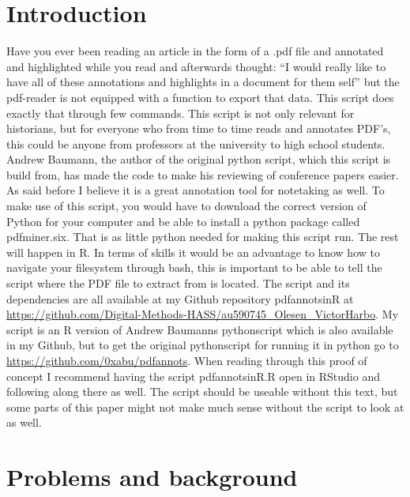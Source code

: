 \documentclass{article}
\begin{document}
\section{Introduction}
Have you ever been reading an article in the form of a .pdf file and annotated and highlighted while you read and afterwards thought: “I would really like to have all of these annotations and highlights in a document for them self” but the pdf-reader is not equipped with a function to export that data. This script does exactly that through few commands. This script is not only relevant for historians, but for everyone who from time to time reads and annotates PDF’s, this could be anyone from professors at the university to high school students. Andrew Baumann, the author of the original python script, which this script is build from, has made the code to make his reviewing of conference papers easier. As said before I believe it is a great annotation tool for notetaking as well. \newline
To make use of this script, you would have to download the correct version of Python for your computer and be able to install a python package called pdfminer.six. That is as little python needed for making this script run. The rest will happen in R. In terms of skills it would be an advantage to know how to navigate your filesystem through bash, this is important to be able to tell the script where the PDF file to extract from is located.\newline
The script and its dependencies are all available at my Github repository pdfannots\textunderscore in\textunderscore R at \url{https://github.com/Digital-Methods-HASS/au590745_Olesen_VictorHarbo}. My script is an R version of Andrew Baumanns pythonscript which is also available in my Github, but to get the original pythonscript for running it in python go to \url{https://github.com/0xabu/pdfannots}. When reading through this proof of concept I recommend having the script pdfannots\textunderscore inR.R open in RStudio and following along there as well. The script should be useable without this text, but some parts of this paper might not make much sense without the script to look at as well. 

\section{Problems and background}
\end{document}
